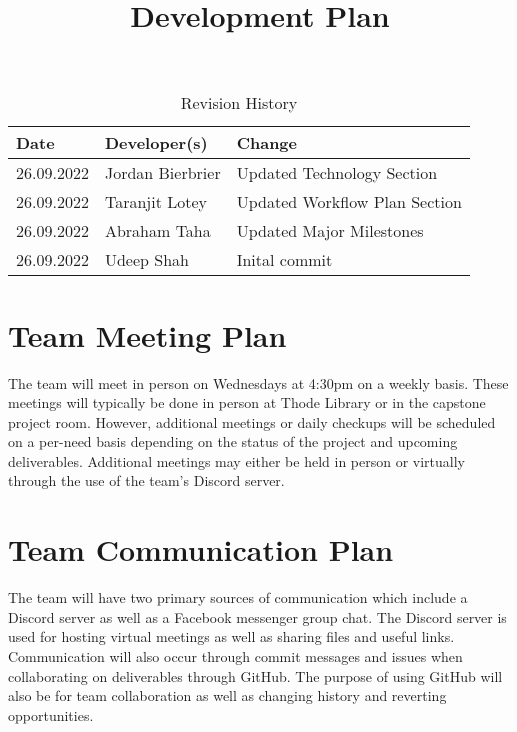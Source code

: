 \documentclass{article}
\title{Development Plan\\\progname}
\author{\authname}
\date{}
\begin{document}
\begin{table}[hp]
\caption{Revision History} \label{TblRevisionHistory}
\begin{tabularx}{\textwidth}{llX}
\toprule
\textbf{Date} & \textbf{Developer(s)} & \textbf{Change}\\
\midrule
26.09.2022 & Jordan Bierbrier & Updated Technology Section\\
26.09.2022 & Taranjit Lotey & Updated Workflow Plan Section\\
26.09.2022 & Abraham Taha & Updated Major Milestones\\
26.09.2022 & Udeep Shah & Inital commit\\
\bottomrule
\end{tabularx}
\end{table}

\newpage

\maketitle

\section{Team Meeting Plan}
The team will meet in person on Wednesdays at 4:30pm on a weekly basis. These meetings will typically be done in person at Thode Library or in the capstone project room. However, additional meetings or daily checkups will be scheduled on a per-need basis depending on the status of the project and upcoming deliverables. Additional meetings may either be held in person or virtually through the use of the team’s Discord server.

\section{Team Communication Plan}
The team will have two primary sources of communication which include a Discord server as well as a Facebook messenger group chat. The Discord server is used for hosting virtual meetings as well as sharing files and useful links. Communication will also occur through commit messages and issues when collaborating on deliverables through GitHub. The purpose of using GitHub will also be for team collaboration as well as changing history and reverting opportunities. 
\end{document}
